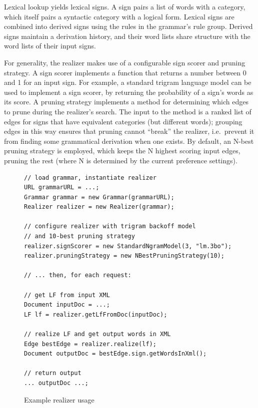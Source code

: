 \documentclass[11pt]{article}
\begin{document}
Lexical lookup yields lexical signs. A sign pairs a list of words with a
category, which itself pairs a syntactic category with a logical form.
Lexical signs are combined into derived signs using the rules in the
grammar's rule group. Derived signs maintain a derivation history, and
their word lists share structure with the word lists of their input
signs.

For generality, the realizer makes use of a configurable sign scorer and
pruning strategy. A sign scorer implements a function that returns a
number between 0 and 1 for an input sign. For example, a standard
trigram language model can be used to implement a sign scorer, by
returning the probability of a sign's words as its score. A pruning
strategy implements a method for determining which edges to prune during
the realizer's search. The input to the method is a ranked list of edges
for signs that have equivalent categories (but different words);
grouping edges in this way ensures that pruning cannot ``break'' the
realizer, i.e.\ prevent it from finding some grammatical derivation when
one exists. By default, an N-best pruning strategy is employed, which
keeps the N highest scoring input edges, pruning the rest (where N is
determined by the current preference settings).


\begin{figure}%
\begin{center}
\begin{lstlisting}
// load grammar, instantiate realizer
URL grammarURL = ...;
Grammar grammar = new Grammar(grammarURL);
Realizer realizer = new Realizer(grammar);

// configure realizer with trigram backoff model 
// and 10-best pruning strategy
realizer.signScorer = new StandardNgramModel(3, "lm.3bo");
realizer.pruningStrategy = new NBestPruningStrategy(10);

// ... then, for each request:

// get LF from input XML
Document inputDoc = ...;
LF lf = realizer.getLfFromDoc(inputDoc);

// realize LF and get output words in XML
Edge bestEdge = realizer.realize(lf);
Document outputDoc = bestEdge.sign.getWordsInXml();

// return output
... outputDoc ...;
\end{lstlisting}
\caption{Example realizer usage}
\label{realizer-usage}
\end{center}
\end{figure}
\end{document}
